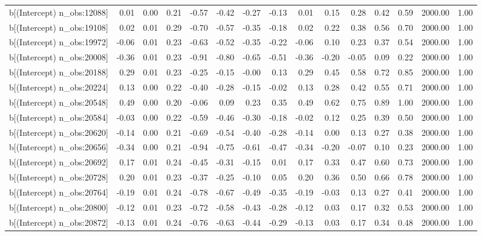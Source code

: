 \begin{table}[ht]
\begin{tabular}{rrrrrrrrrrrrrrr}
  b[(Intercept) n\_obs:12088] & 0.01 & 0.00 & 0.21 & -0.57 & -0.42 & -0.27 & -0.13 & 0.01 & 0.15 & 0.28 & 0.42 & 0.59 & 2000.00 & 1.00 \\ 
  b[(Intercept) n\_obs:19108] & 0.02 & 0.01 & 0.29 & -0.70 & -0.57 & -0.35 & -0.18 & 0.02 & 0.22 & 0.38 & 0.56 & 0.70 & 2000.00 & 1.00 \\ 
  b[(Intercept) n\_obs:19972] & -0.06 & 0.01 & 0.23 & -0.63 & -0.52 & -0.35 & -0.22 & -0.06 & 0.10 & 0.23 & 0.37 & 0.54 & 2000.00 & 1.00 \\ 
  b[(Intercept) n\_obs:20008] & -0.36 & 0.01 & 0.23 & -0.91 & -0.80 & -0.65 & -0.51 & -0.36 & -0.20 & -0.05 & 0.09 & 0.22 & 2000.00 & 1.00 \\ 
  b[(Intercept) n\_obs:20188] & 0.29 & 0.01 & 0.23 & -0.25 & -0.15 & -0.00 & 0.13 & 0.29 & 0.45 & 0.58 & 0.72 & 0.85 & 2000.00 & 1.00 \\ 
  b[(Intercept) n\_obs:20224] & 0.13 & 0.00 & 0.22 & -0.40 & -0.28 & -0.15 & -0.02 & 0.13 & 0.28 & 0.42 & 0.55 & 0.71 & 2000.00 & 1.00 \\ 
  b[(Intercept) n\_obs:20548] & 0.49 & 0.00 & 0.20 & -0.06 & 0.09 & 0.23 & 0.35 & 0.49 & 0.62 & 0.75 & 0.89 & 1.00 & 2000.00 & 1.00 \\ 
  b[(Intercept) n\_obs:20584] & -0.03 & 0.00 & 0.22 & -0.59 & -0.46 & -0.30 & -0.18 & -0.02 & 0.12 & 0.25 & 0.39 & 0.50 & 2000.00 & 1.00 \\ 
  b[(Intercept) n\_obs:20620] & -0.14 & 0.00 & 0.21 & -0.69 & -0.54 & -0.40 & -0.28 & -0.14 & 0.00 & 0.13 & 0.27 & 0.38 & 2000.00 & 1.00 \\ 
  b[(Intercept) n\_obs:20656] & -0.34 & 0.00 & 0.21 & -0.94 & -0.75 & -0.61 & -0.47 & -0.34 & -0.20 & -0.07 & 0.10 & 0.23 & 2000.00 & 1.00 \\ 
  b[(Intercept) n\_obs:20692] & 0.17 & 0.01 & 0.24 & -0.45 & -0.31 & -0.15 & 0.01 & 0.17 & 0.33 & 0.47 & 0.60 & 0.73 & 2000.00 & 1.00 \\ 
  b[(Intercept) n\_obs:20728] & 0.20 & 0.01 & 0.23 & -0.37 & -0.25 & -0.10 & 0.05 & 0.20 & 0.36 & 0.50 & 0.66 & 0.78 & 2000.00 & 1.00 \\ 
  b[(Intercept) n\_obs:20764] & -0.19 & 0.01 & 0.24 & -0.78 & -0.67 & -0.49 & -0.35 & -0.19 & -0.03 & 0.13 & 0.27 & 0.41 & 2000.00 & 1.00 \\ 
  b[(Intercept) n\_obs:20800] & -0.12 & 0.01 & 0.23 & -0.72 & -0.58 & -0.43 & -0.28 & -0.12 & 0.03 & 0.17 & 0.32 & 0.53 & 2000.00 & 1.00 \\ 
  b[(Intercept) n\_obs:20872] & -0.13 & 0.01 & 0.24 & -0.76 & -0.63 & -0.44 & -0.29 & -0.13 & 0.03 & 0.17 & 0.34 & 0.48 & 2000.00 & 1.00 \\ 

\end{tabular}
\end{table}
